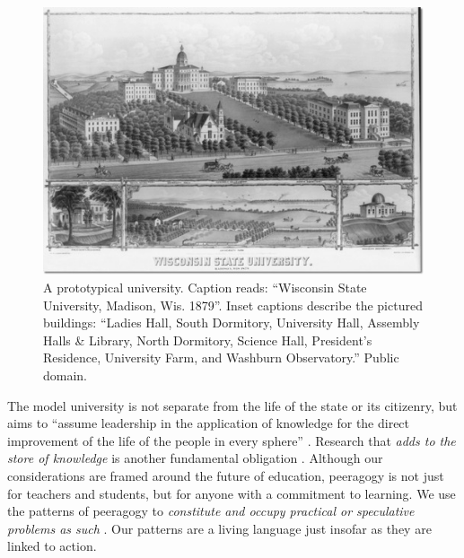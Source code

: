 \begin{figure}
\vspace{-.2cm}
\begin{center}
\includegraphics[width=.5\textwidth,trim=0 30 10 2, clip=true]{wisconsin-map}
\end{center}
\vspace{-.1cm}
\caption{A prototypical university.  Caption reads: ``Wisconsin State
  University, Madison, Wis. 1879''.  Inset captions describe the
  pictured buildings: ``Ladies Hall, South Dormitory, University Hall,
  Assembly Halls \& Library, North Dormitory, Science Hall, President's
  Residence, University Farm, and Washburn Observatory.''  Public
  domain.\label{madison-map}}
\vspace{-.3cm}
\end{figure}

The model university is not separate from the life of the state or its
citizenry, but aims to ``assume leadership in the application of
knowledge for the direct improvement of the life of the people in
every sphere'' \cite[p.~88]{curti1949university}. Research that \emph{adds
to the store of knowledge} is another fundamental
obligation \cite[p.~550]{curti1949university}.  Although 
our considerations are framed around the future of education, peeragogy
is not just for teachers and students, but for anyone with a
commitment to learning.  We use the patterns of peeragogy to
\emph{constitute and occupy practical or speculative problems as such}
\cite[p.~204]{deleuze1994difference}.
%
Our patterns are a living language just insofar as they are linked to
action.


